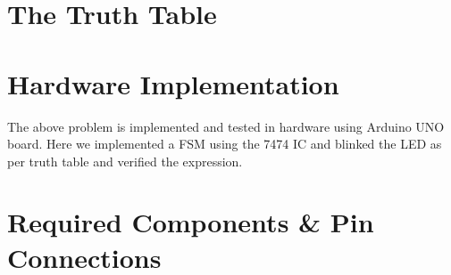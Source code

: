 \documentclass[a4paper,12pt]{article}
\begin{document}
\section*{\textbf{The Truth Table}}
\begin{center}
        \begin{table}[h]
        
\end{table}
\end{center}
\section*{\textbf{Hardware Implementation}}
The above problem is implemented and tested in hardware using Arduino UNO board. Here we implemented a FSM using the 7474 IC and blinked the LED as per truth table and verified the expression.
\section*{Required Components \& Pin Connections}
\end{document}
